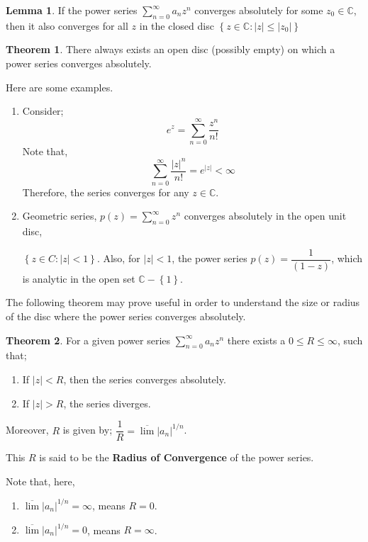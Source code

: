\documentclass[12pt]{article}
\newcommand{\C}{\mathbb{C}}
\theoremstyle{definition}
\newtheorem{thm}{Theorem}
\newtheorem{lem}{Lemma}
\newenvironment{theorem}{
\begin{tcolorbox}[colback=green!5!white,colframe=green!75!black, parbox = false]\begin{thm} }{\end{thm}\end{tcolorbox} }
\newenvironment{lemma}{
\begin{tcolorbox}[colback=green!5!white,colframe=green!75!black, parbox = false]\begin{lem} }{\end{lem}\end{tcolorbox} }
\newenvironment{note}{
\begin{tcolorbox}[colback=blue!5!white,colframe=blue!75!black,title=Note, parbox = false] }{\end{tcolorbox} }
\newenvironment{example}{
\begin{tcolorbox}[colback=blue!5!white,colframe=blue!75!black, title = Example, parbox = false] }{\end{tcolorbox} }
\begin{document}
\begin{lemma}
    If the power series $\sum_{n=0}^{\infty} a_nz^n$ converges absolutely for some $z_0 \in \C$, then it also converges for all $z$ in the closed disc $\left\{ z \in \C : \vert z\vert \leq \vert z_0 \vert \right\}$
\end{lemma}

\begin{theorem}
    There always exists an open disc (possibly empty) on which a power series converges absolutely.
\end{theorem}

Here are some examples.

\begin{example}
    \begin{enumerate}
        \item Consider; $$e^z = \sum_{n = 0}^{\infty} \dfrac{z^n}{n!}$$
        Note that, 
        $$\sum_{n=0}^{\infty} \dfrac{\vert z\vert^n}{n!} = e^{\vert z \vert} < \infty$$
        Therefore, the series converges for any $z \in \C$.
        \item Geometric series, $p(z) = \sum_{n=0}^{\infty} z^n$ converges absolutely in the open unit disc,
        
        $\left\{ z \in C : \vert z \vert < 1 \right\}$.
        Also, for $\vert z \vert < 1$, the power series $p(z) = \dfrac{1}{(1 - z)}$, which is analytic in the open set $\C - \left\{1 \right\}$.
    \end{enumerate}
\end{example}

The following theorem may prove useful in order to understand the size or radius of the disc where the power series converges absolutely.

\begin{theorem}
    For a given power series $\sum_{n=0}^{\infty} a_nz^n$ there exists a $0 \leq R \leq \infty$, such that;
    \begin{enumerate}
        \item If $\vert z \vert < R$, then the series converges absolutely.
        \item If $\vert z \vert > R$, the series diverges.
    \end{enumerate}
    Moreover, $R$ is given by; $\dfrac{1}{R} = \overline{\lim} \vert a_n \vert^{1/n}$.

    This $R$ is said to be the \textbf{Radius of Convergence} of the power series.

    \begin{note}
        Note that, here, 
        \begin{enumerate}
            \item $\overline{\lim} \vert a_n\vert^{1/n} = \infty$, means $R = 0$.
            \item $\overline{\lim} \vert a_n\vert^{1/n} = 0$, means $R = \infty$.
        \end{enumerate}
    \end{note}
\end{theorem}
\end{document}
